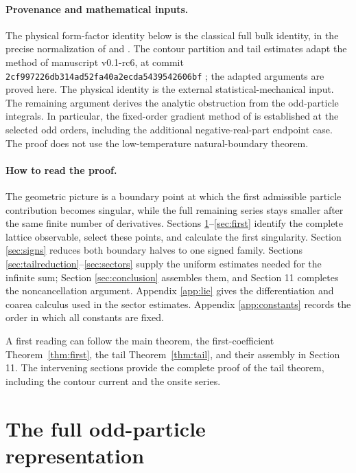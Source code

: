 \documentclass[11pt]{article}
\numberwithin{equation}{section}
\theoremstyle{definition}
\begin{document}
\paragraph{Provenance and mathematical inputs.}
The physical form-factor identity below is the classical full bulk
identity, in the precise normalization of \cite[eqs.~(1.9), (1.11),
(3.13), (3.17)--(3.20)]{Orrick2001} and \cite[eqs.~(3), (5)--(9)]{Boukraa2008}.
The contour partition and tail estimates adapt the method of manuscript
v0.1-rc6, at commit
\texttt{2cf997226db314ad52fa40a2ecda5439542606bf} \cite{Snapshot};
the adapted arguments are proved here. The physical identity is the
external statistical-mechanical input. The remaining argument derives
the analytic obstruction from the odd-particle integrals. In particular,
the fixed-order gradient method of \cite{TW2014} is established at the
selected odd orders, including the additional negative-real-part endpoint
case. The proof does not use the low-temperature natural-boundary theorem.

\paragraph{How to read the proof.}
The geometric picture is a boundary point at which the first admissible
particle contribution becomes singular, while the full remaining series
stays smaller after the same finite number of derivatives. Sections
\ref{sec:setup}--\ref{sec:first} identify the complete lattice observable,
select these points, and calculate the first singularity. Section
\ref{sec:signs} reduces both boundary halves to one signed family.
Sections \ref{sec:tailreduction}--\ref{sec:sectors} supply the uniform
estimates needed for the infinite sum; Section \ref{sec:conclusion}
assembles them, and Section 11 completes the noncancellation argument.
Appendix \ref{app:lie} gives the differentiation and coarea calculus used
in the sector estimates. Appendix \ref{app:constants} records the order
in which all constants are fixed.

A first reading can follow the main theorem, the first-coefficient
Theorem~\ref{thm:first}, the tail Theorem~\ref{thm:tail}, and their
assembly in Section 11. The intervening sections provide the complete
proof of the tail theorem, including the contour current and the onsite
series.

\tableofcontents

\section{The full odd-particle representation}\label{sec:setup}
\end{document}
